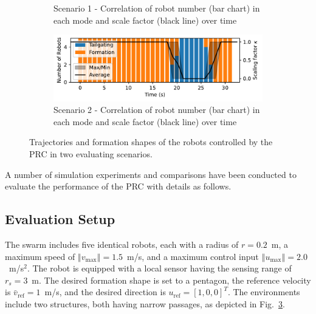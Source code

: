 \begin{figure}
\begin{subfigure}[b]{0.495\textwidth}
    \caption{Scenario 1 - Correlation of robot number (bar chart) in each mode and scale factor (black line) over time}
    \label{fig:cor1}
    \end{subfigure}
    \begin{subfigure}[b]{0.495\textwidth}
    \includegraphics[width=\textwidth]{paper3/images/correlation_scen2.pdf}
    \caption{Scenario 2 - Correlation of robot number (bar chart) in each mode and scale factor (black line) over time}
    \label{fig:cor2}
    \end{subfigure}
    \caption{Trajectories and formation shapes of the robots controlled by the PRC in two evaluating scenarios.}
    \label{fig:path}
\end{figure}

A number of simulation experiments and comparisons have been conducted to evaluate the performance of the PRC with details as follows.

\subsection{Evaluation Setup}
The swarm includes five identical robots, each with a radius of $r=0.2$~m, a maximum speed of $\left\Vert v_\text{max}\right\Vert=1.5$~m/s, and a maximum control input $\left\Vert u_\text{max}\right\Vert=2.0$~m/s$^2$. The robot is equipped with a local sensor having the sensing range of $r_s=3$~m. The desired formation shape is set to a pentagon, the reference velocity is $\bar{v}_\text{ref}=1$~m/s, and the desired direction is $u_\text{ref}=[1,0,0]^T$. The environments include two structures, both having narrow passages, as depicted in Fig.~\ref{fig:path}.

